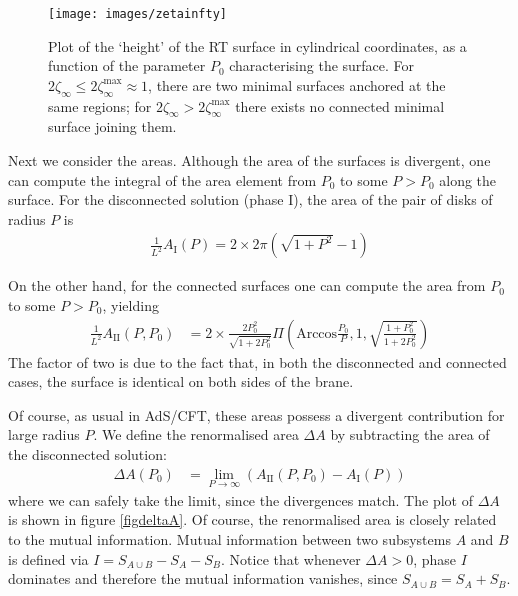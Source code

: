 \begin{figure}[h]
\begin{center}
\texttt{[image: images/zetainfty]}
\caption{Plot of the `height' of the RT surface in cylindrical coordinates, as a function of the parameter $P_0$ characterising the surface. For $2\zeta_\infty\leq 2\zeta_\infty^{\text{max}}\approx 1$, there are two minimal surfaces anchored at the same regions; for $2\zeta_\infty> 2\zeta_\infty^{\text{max}}$ there exists no connected minimal surface joining them. }
\label{figzetainfty}
\end{center}
\end{figure}

Next we consider the areas. Although the area of the surfaces is divergent, one can compute the integral of the area element from $P_0$ to some $P>P_0$ along the surface\cite{Krtous:2014pva}. For the disconnected solution (phase I), the area of the pair of disks of radius $P$ is
\begin{align}\label{zetainfty}
\frac{1}{L^2}A_{\text {I}}(P)=2\times2\pi\left( \sqrt{1+P^2}-1 \right)
\end{align}

On the other hand, for the connected surfaces one can compute the area from $P_0$ to some $P>P_0$, yielding
\begin{align}\label{}
\frac{1}{L^2}A_{\text {II}}(P,P_0)&= 2\times\frac{2P_0^2}{\sqrt{1+2P_0^2}} \Pi\left( \mbox{Arccos}\frac{P_0}{P},1,\sqrt{\frac{1+P_0^2}{1+2P_0^2}} \right)
\end{align}
The factor of two is due to the fact that, in both the disconnected and connected cases, the surface is identical on both sides of the brane.

Of course, as usual in AdS/CFT, these areas possess a divergent contribution for large radius $P$. We define the renormalised area $\Delta A$ by subtracting the area of the disconnected solution:
\begin{align}\label{dAP01}
\Delta A(P_0)&=\lim_{P\to \infty}\left( A_{\text {II}}(P,P_0)-A_{\text {I}} (P)\right)
\end{align}
where we can safely take the limit, since the divergences match. The plot of $\Delta A$ is shown in figure \ref{figdeltaA}. Of course, the renormalised area is closely related to the mutual information. Mutual information between two subsystems $A$ and $B$ is defined via $I=S_{A\cup B}-S_A-S_B$. Notice that whenever $\Delta A>0$, phase $I$ dominates and therefore the mutual information vanishes, since $S_{A\cup B}=S_A+S_B$.

